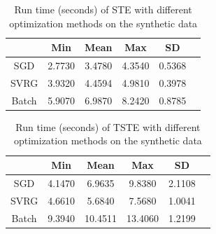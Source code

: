\documentclass[letterpaper]{article}
\begin{document}
		\begin{table}[ht]
			\label{tab:2}
			\centering
			\begin{tabular}{c||c c c c c }
				\hline
						& Min 	 & Mean 	& Max 		& SD 		\\ \hline \hline    
				SGD 	& 2.7730 & 3.4780 	& 4.3540 	& 0.5368 	\\  \hline        
				SVRG 	& 3.9320 & 4.4594 	& 4.9810 	& 0.3978 	\\  \hline        
				Batch 	& 5.9070 & 6.9870 	& 8.2420 	& 0.8785 	\\  \hline        
			\end{tabular}
			\caption{Run time (seconds) of STE with different optimization methods on the synthetic data}
		\end{table}
		\begin{table}[ht]
			\label{tab:3}
			\centering
			\begin{tabular}{c||c c c c c }
				\hline
						& Min 	 & Mean 	& Max 		& SD 		\\ \hline \hline 
				SGD 	& 4.1470 & 6.9635 	& 9.8380 	& 2.1108 	\\    \hline   
				SVRG 	& 4.6610 & 5.6840 	& 7.5680 	& 1.0041 	\\    \hline   
				Batch 	& 9.3940 & 10.4511 	& 13.4060 	& 1.2199 	\\    \hline        
			\end{tabular}
			\caption{Run time (seconds) of TSTE with different optimization methods on the synthetic data}
		\end{table}
\end{document}
